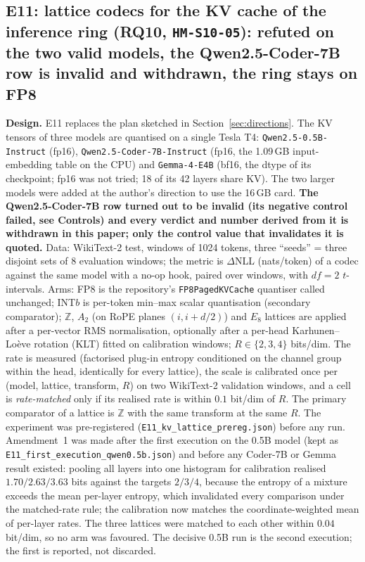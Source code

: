 \documentclass[11pt,a4paper]{article}
\begin{document}
\subsection{E11: lattice codecs for the KV cache of the inference ring (RQ10, \texttt{HM-S10-05}): refuted on the two valid models, the Qwen2.5-Coder-7B row is invalid and withdrawn, the ring stays on FP8}
\label{sec:e11}

\textbf{Design.} E11 replaces the plan sketched in Section~\ref{sec:directions}. The KV tensors of three models are quantised on a single Tesla T4: \texttt{Qwen2.5-0.5B-Instruct} (fp16), \texttt{Qwen2.5-Coder-7B-Instruct} (fp16, the 1.09\,GB input-embedding table on the CPU) and \texttt{Gemma-4-E4B} (bf16, the dtype of its checkpoint; fp16 was not tried; 18 of its 42 layers share KV). The two larger models were added at the author's direction to use the 16\,GB card. \textbf{The Qwen2.5-Coder-7B row turned out to be invalid (its negative control failed, see Controls) and every verdict and number derived from it is withdrawn in this paper; only the control value that invalidates it is quoted.} Data: WikiText-2 test, windows of 1024 tokens, three ``seeds'' = three disjoint sets of 8 evaluation windows; the metric is $\Delta$NLL (nats/token) of a codec against the same model with a no-op hook, paired over windows, with $df=2$ $t$-intervals. Arms: FP8 is the repository's \texttt{FP8PagedKVCache} quantiser called unchanged; INT$b$ is per-token min--max scalar quantisation (secondary comparator); $\mathbb{Z}$, $A_2$ (on RoPE planes $(i, i+d/2)$) and $E_8$ lattices are applied after a per-vector RMS normalisation, optionally after a per-head Karhunen--Lo\`eve rotation (KLT) fitted on calibration windows; $R\in\{2,3,4\}$ bits/dim. The rate is measured (factorised plug-in entropy conditioned on the channel group within the head, identically for every lattice), the scale is calibrated once per (model, lattice, transform, $R$) on two WikiText-2 validation windows, and a cell is \emph{rate-matched} only if its realised rate is within $0.1$ bit/dim of $R$. The primary comparator of a lattice is $\mathbb{Z}$ with the same transform at the same $R$. The experiment was pre-registered (\texttt{E11\_kv\_lattice\_prereg.json}) before any run. Amendment~1 was made after the first execution on the 0.5B model (kept as \texttt{E11\_first\_execution\_qwen0.5b.json}) and before any Coder-7B or Gemma result existed: pooling all layers into one histogram for calibration realised $1.70/2.63/3.63$ bits against the targets $2/3/4$, because the entropy of a mixture exceeds the mean per-layer entropy, which invalidated every comparison under the matched-rate rule; the calibration now matches the coordinate-weighted mean of per-layer rates. The three lattices were matched to each other within $0.04$ bit/dim, so no arm was favoured. The decisive 0.5B run is the second execution; the first is reported, not discarded.
\end{document}
